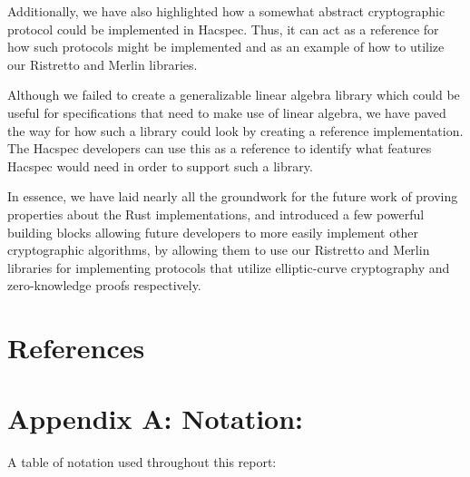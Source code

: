 \documentclass{article}
\begin{document}
Additionally, we have also highlighted how a somewhat abstract
cryptographic protocol could be implemented in Hacspec. Thus, it can
act as a reference for how such protocols might be implemented and
as an example of how to utilize our Ristretto and Merlin libraries.

Although we failed to create a generalizable linear algebra library
which could be useful for specifications that need to make use of
linear algebra, we have paved the way for how such a library could
look by creating a reference implementation. The Hacspec developers
can use this as a reference to identify what features Hacspec would
need in order to support such a library.

In essence, we have laid nearly all the groundwork for the future work
of proving properties about the Rust implementations, and introduced a
few powerful building blocks allowing future developers to more easily
implement other cryptographic algorithms, by allowing them to use our
Ristretto and Merlin libraries for implementing protocols that utilize
elliptic-curve cryptography and zero-knowledge proofs respectively.

\section{References} \label{references}
\printbibliography

\section{Appendix A: Notation:} \label{notation}

A table of notation used throughout this report:
\end{document}
